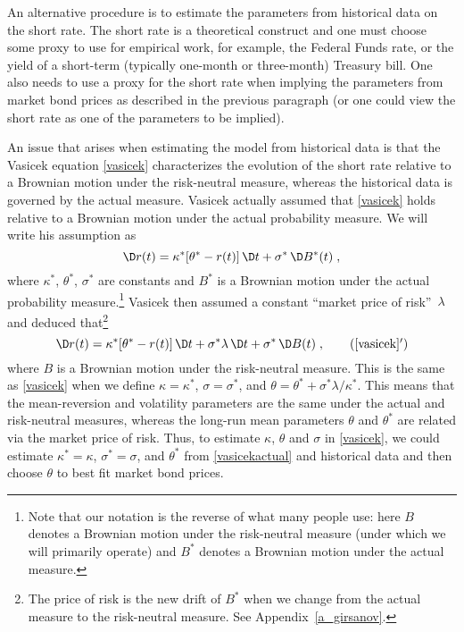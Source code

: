 An alternative procedure is to estimate the parameters from historical data on the short rate.  The short rate is a theoretical construct and one must choose some proxy to use for empirical work, for example, the Federal Funds rate, or the yield of a short-term (typically one-month or three-month) Treasury bill.  One also needs to use a proxy for the short rate when implying the parameters from market bond prices as described in the previous paragraph (or one could view the short rate as one of the parameters to be implied).

An issue that arises when estimating the model from historical data is that the Vasicek equation \eqref{vasicek} characterizes the evolution of the short rate relative to a Brownian motion under the risk-neutral measure, whereas the historical data is governed by the actual measure.  Vasicek \cite{Vasicek} actually assumed that  \eqref{vasicek} holds relative to a Brownian motion under the actual probability measure.  We will write his assumption as
\begin{equation}\label{vasicekactual}
\D r(t) = \kappa^*[\theta^*-r(t)]\,\D t + \sigma^*\,\D B^*(t)\;,
\end{equation}
where $\kappa^*$, $\theta^*$, $\sigma^*$ are constants and $B^*$ is a Brownian motion under the actual probability measure.\footnote{Note that our notation is the reverse of what many people use: here $B$ denotes a Brownian motion under the risk-neutral measure (under which we will primarily operate) and $B^*$ denotes a Brownian motion under the actual measure.}  Vasicek then assumed a constant ``market price of risk''~$\lambda$ and deduced that\footnote{The price of risk is the new drift of $B^*$ when we change from the actual measure to the risk-neutral measure.  See Appendix~\ref{a_girsanov}.}
\begin{equation}\label{vasicekpriceofrisk}
\D r(t) = \kappa^*[\theta^*-r(t)]\,\D t + \sigma^*\lambda\,\D t + \sigma^*\,\D B(t)\;, \tag{\ref{vasicek}$'$}
\end{equation}
where $B$ is a Brownian motion under the risk-neutral measure.  This is the same as  \eqref{vasicek} when we define $\kappa=\kappa^*$, $\sigma=\sigma^*$, and $\theta = \theta^*+\sigma^*\lambda/\kappa^*$.  This means that the mean-reversion and volatility parameters are the same under the actual and risk-neutral measures, whereas the long-run mean parameters $\theta$ and $\theta^*$ are related via the market price of risk.  Thus, to estimate  $\kappa$, $\theta$ and $\sigma$ in  \eqref{vasicek}, we could estimate $\kappa^*=\kappa$, $\sigma^*=\sigma$, and $\theta^*$ from  \eqref{vasicekactual} and historical data and then choose  $\theta$ to best fit market bond prices.

